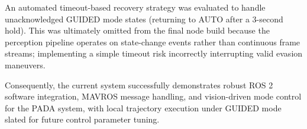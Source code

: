\documentclass[12pt,a4paper]{article}
\begin{document}
An automated timeout-based recovery strategy was evaluated to handle unacknowledged GUIDED mode states (returning to AUTO after a 3-second hold). This was ultimately omitted from the final node build because the perception pipeline operates on state-change events rather than continuous frame streams; implementing a simple timeout risk incorrectly interrupting valid evasion maneuvers.

Consequently, the current system successfully demonstrates robust ROS 2 software integration, MAVROS message handling, and vision-driven mode control for the PADA system, with local trajectory execution under GUIDED mode slated for future control parameter tuning.
\end{document}
